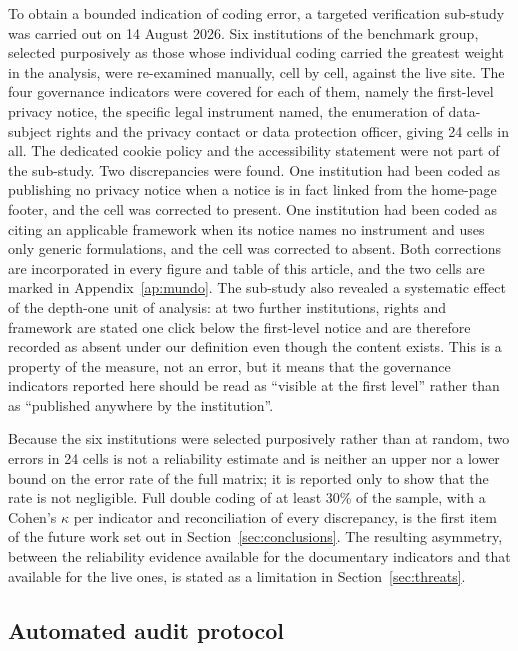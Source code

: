 \documentclass[pdflatex,sn-basic,Numbered,iicol]{sn-jnl}
\theoremstyle{thmstyleone}
\theoremstyle{thmstyletwo}
\theoremstyle{thmstylethree}
\begin{document}
To obtain a bounded indication of coding error, a targeted verification sub-study was carried out on 14 August 2026. Six institutions of the benchmark group, selected purposively as those whose individual coding carried the greatest weight in the analysis, were re-examined manually, cell by cell, against the live site. The four governance indicators were covered for each of them, namely the first-level privacy notice, the specific legal instrument named, the enumeration of data-subject rights and the privacy contact or data protection officer, giving 24 cells in all. The dedicated cookie policy and the accessibility statement were not part of the sub-study. Two discrepancies were found. One institution had been coded as publishing no privacy notice when a notice is in fact linked from the home-page footer, and the cell was corrected to present. One institution had been coded as citing an applicable framework when its notice names no instrument and uses only generic formulations, and the cell was corrected to absent. Both corrections are incorporated in every figure and table of this article, and the two cells are marked in Appendix~\ref{ap:mundo}. The sub-study also revealed a systematic effect of the depth-one unit of analysis: at two further institutions, rights and framework are stated one click below the first-level notice and are therefore recorded as absent under our definition even though the content exists. This is a property of the measure, not an error, but it means that the governance indicators reported here should be read as ``visible at the first level'' rather than as ``published anywhere by the institution''.

Because the six institutions were selected purposively rather than at random, two errors in 24 cells is not a reliability estimate and is neither an upper nor a lower bound on the error rate of the full matrix; it is reported only to show that the rate is not negligible. Full double coding of at least 30\% of the sample, with a Cohen's $\kappa$ per indicator and reconciliation of every discrepancy, is the first item of the future work set out in Section~\ref{sec:conclusions}. The resulting asymmetry, between the reliability evidence available for the documentary indicators and that available for the live ones, is stated as a limitation in Section~\ref{sec:threats}.

\subsection{Automated audit protocol}\label{sec:methods-audit}
\end{document}
